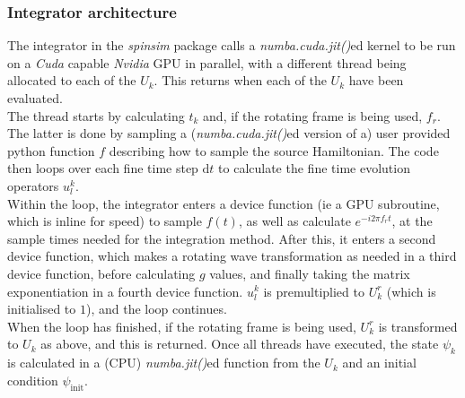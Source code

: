 \documentclass{jors}
\begin{document}
		\subsubsection*{Integrator architecture}
			The integrator in the \emph{spinsim} package calls a \emph{numba.cuda.jit()}ed kernel to be run on a \emph{Cuda} capable \emph{Nvidia} GPU in parallel, with a different thread being allocated to each of the \(U_k\). This returns when each of the \(U_k\) have been evaluated.\\
			
			The thread starts by calculating \(t_k\) and, if the rotating frame is being used, \(f_r\). The latter is done by sampling a (\emph{numba.cuda.jit()}ed version of a) user provided python function \(f\) describing how to sample the source Hamiltonian. The code then loops over each fine time step \(\mathrm{d}t\) to calculate the fine time evolution operators \(u^k_l\).\\
			
			Within the loop, the integrator enters a device function (ie a GPU subroutine, which is inline for speed) to sample \(f(t)\), as well as calculate \(e^{-i 2 \pi f_r t}\), at the sample times needed for the integration method. After this, it enters a second device function, which makes a rotating wave transformation as needed in a third device function, before calculating \(g\) values, and finally taking the matrix exponentiation in a fourth device function. \(u^k_l\) is premultiplied to \(U^r_k\) (which is initialised to \(1\)), and the loop continues.\\
			
			When the loop has finished, if the rotating frame is being used, \(U^r_k\) is transformed to \(U_k\) as above, and this is returned. Once all threads have executed, the state \(\psi_k\) is calculated in a (CPU) \emph{numba.jit()}ed function from the \(U_k\) and an initial condition \(\psi_{\mathrm{init}}\).
	
	
\end{document}
